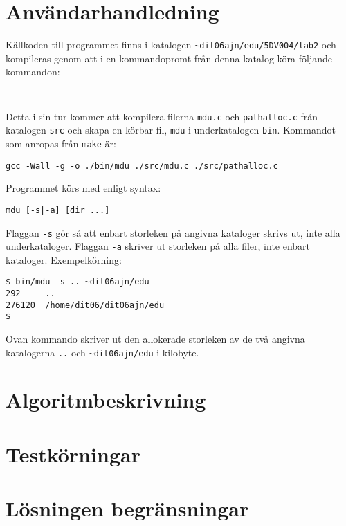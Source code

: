 \documentclass[a4paper, 12pt]{article}
\begin{document}
\section{Användarhandledning}\label{sec:anvandarhandledning}
Källkoden till programmet finns i katalogen
\verb!~dit06ajn/edu/5DV004/lab2! och kompileras genom att i en
kommandopromt från denna katalog köra följande kommandon:

\begin{verbatim}


\end{verbatim}

Detta i sin tur kommer att kompilera filerna \verb!mdu.c! och
\verb!pathalloc.c! från katalogen \verb!src! och skapa en körbar fil,
\verb!mdu! i underkatalogen \verb!bin!. Kommandot som anropas från
\verb!make! är:

\verb!gcc -Wall -g -o ./bin/mdu ./src/mdu.c ./src/pathalloc.c!

Programmet körs med enligt syntax:

\verb!mdu [-s|-a] [dir ...]!

Flaggan \verb!-s! gör så att enbart storleken på angivna kataloger
skrivs ut, inte alla underkataloger. Flaggan \verb!-a!  skriver ut
storleken på alla filer, inte enbart kataloger. Exempelkörning:

\begin{verbatim}
$ bin/mdu -s .. ~dit06ajn/edu
292     ..
276120  /home/dit06/dit06ajn/edu
$
\end{verbatim}

Ovan kommando skriver ut den allokerade storleken av de två angivna
katalogerna \verb!..! och \verb!~dit06ajn/edu! i kilobyte.

% 
% 

\section{Algoritmbeskrivning}\label{sec:algoritmbeskrivning}

\section{Testkörningar}\label{sec:testkorningar}

\section{Lösningen begränsningar}\label{sec:losningensbegransningar}
\end{document}
